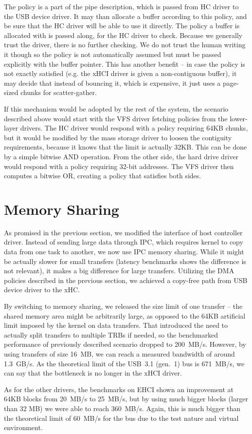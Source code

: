The policy is a part of the pipe description, which is passed from HC driver to
the USB device driver. It may than allocate a buffer according to this
policy, and be sure that the HC driver will be able to use it directly. The
policy a buffer is allocated with is passed along, for the HC driver to check.
Because we generally trust the driver, there is no further checking. We do not
trust the human writing it though so the policy is not automatically assumed
but must be passed explicitly with the buffer pointer. This has another benefit
-- in case the policy is not exactly satisfied (e.g. the xHCI driver is given
a non-contiguous buffer), it may decide that instead of bouncing it, which is
expensive, it just uses a page-sized chunks for scatter-gather.

If this mechanism would be adopted by the rest of the system, the scenario
described above would start with the VFS driver fetching policies from the
lower-layer drivers. The HC driver would respond with a policy requiring 64KB
chunks, but it would be modified by the mass storage driver to loosen the
contiguity requirements, because it knows that the limit is actually 32KB. This
can be done by a simple bitwise AND operation. From the other side, the hard
drive driver would respond with a policy requiring 32-bit addresses. The VFS
driver then computes a bitwise OR, creating a policy that satisfies both sides.

\section{Memory Sharing}

As promised in the previous section, we modified the interface of host
controller driver. Instead of sending large data through IPC, which requires
kernel to copy data from one task to another, we now use IPC memory sharing.
While it might be actually slower for small transfers (latency benchmarks shows
the difference is not relevant), it makes a big difference for large transfers.
Utilizing the DMA policies described in the previous section, we achieved
a copy-free path from USB device driver to the xHC.

By switching to memory sharing, we released the size limit of one transfer --
the shared memory area might be arbitrarily large, as opposed to the 64KB
artificial limit imposed by the kernel on data transfers. That introduced the
need to actually split transfers to multiple TRBs if needed, so the benchmarked
performance of previously described scenario dropped to 200~MB/s. However, by
using transfers of size 16~MB, we can reach a measured bandwidth of around 1.3~GB/s.
As the theoretical limit of the USB~3.1 (gen.~1) bus is 671~MB/s, we can say that the
bottleneck is no longer in the xHCI driver.

As for the other drivers, the benchmarks on EHCI shown an improvement at 64KB
blocks from 20~MB/s to 25~MB/s, but by using much bigger blocks (larger than 32
MB) we were able to reach 360~MB/s. Again, this is much bigger than the
theoretical limit of 60~MB/s for the bus due to the test nature and virtual
environment.
